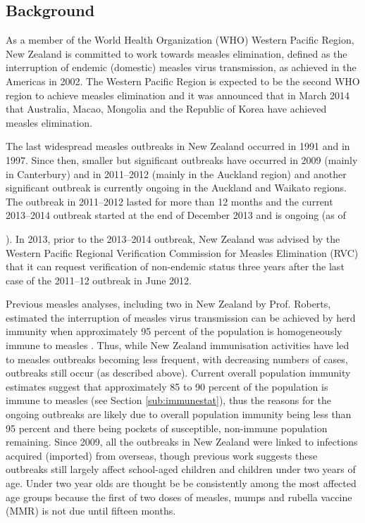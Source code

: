 \documentclass{article}
\begin{document}
\begin{itemize}
\section{Background}

As a member of the World Health Organization (WHO) Western Pacific Region, New Zealand is committed to work towards measles elimination, defined as the interruption of endemic (domestic) measles virus transmission, as achieved in the Americas in 2002. The Western Pacific Region is expected to be the second WHO region to  achieve measles elimination and it was announced that in March 2014 that Australia, Macao, Mongolia and the Republic of Korea have achieved measles elimination.

The last widespread measles outbreaks in New Zealand occurred in 1991 and in 1997. Since then, smaller but significant outbreaks have occurred in 2009 (mainly in Canterbury) and in 2011--2012 (mainly in the Auckland region) and another significant outbreak is currently ongoing in the Auckland and Waikato regions. The outbreak in 2011--2012 lasted for more than 12 months and the current 2013--2014 outbreak started at the end of December 2013 and is ongoing (as of \date{3 July 2014}). In 2013, prior to the 2013--2014 outbreak, New Zealand was advised by the Western Pacific Regional Verification Commission for Measles Elimination (RVC) that it can request verification of non-endemic status three years after the last case of the 2011--12 outbreak in June 2012.

Previous measles analyses, including two in New Zealand by Prof. Roberts, estimated the interruption of measles virus transmission can be achieved by herd immunity when approximately 95 percent of the population is homogeneously immune to measles \citep{roberts0,roberts4}. Thus, while New Zealand immunisation activities have led to measles outbreaks becoming less frequent, with decreasing numbers of cases, outbreaks still occur (as described above). Current overall population immunity estimates suggest that approximately 85 to 90 percent of the population is immune to measles (see Section \ref{sub:immunestat}), thus the reasons for the ongoing outbreaks are likely due to overall population immunity being less than 95 percent and there being pockets of susceptible, non-immune population remaining. Since 2009, all the outbreaks in New Zealand were linked to infections acquired (imported) from overseas, though previous work suggests these outbreaks still largely affect school-aged children and children under two years of age. Under two year olds are thought be be consistently among the most affected age groups because the first of two doses of measles, mumps and rubella vaccine (MMR) is not due until fifteen months.


\end{itemize}
\end{document}
